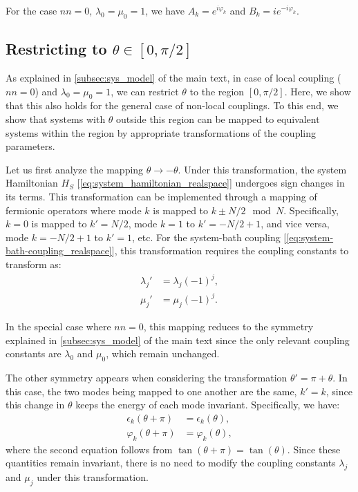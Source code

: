 For the case $nn=0$, $\lambda_0=\mu_0=1$, we have $A_k = e^{i\varphi_k}$ and $B_k = ie^{-i\varphi_k}$.

\subsection{Restricting to $\theta\in[0,\pi/2]$}
\label{app:theta_mapping}

As explained in \cref{subsec:sys_model} of the main text, in case of local coupling ($nn=0$) and $\lambda_0=\mu_0=1$, we can restrict $\theta$ to the region $[0,\pi/2]$. Here, we show that this also holds for the general case of non-local couplings. To this end, we show that systems with $\theta$ outside this region can be mapped to equivalent systems within the region by appropriate transformations of the coupling parameters.

Let us first analyze the mapping $\theta \rightarrow -\theta$. Under this transformation, the system Hamiltonian $H_S$ [\cref{eq:system_hamiltonian_realspace}] undergoes sign changes in its terms. This transformation can be implemented through a mapping of fermionic operators where mode $k$ is mapped to $k\pm N/2 \mod N$. Specifically, $k=0$ is mapped to $k'=N/2$, mode $k=1$ to $k'=-N/2+1$, and vice versa, mode $k=-N/2+1$ to $k'=1$, etc.
For the system-bath coupling [\cref{eq:system-bath-coupling_realspace}], this transformation requires the coupling constants to transform as:
\begin{align}
    \lambda_j' &= \lambda_j(-1)^j,\\
    \mu_j'     &= \mu_j(-1)^j.
\end{align}

In the special case where $nn=0$, this mapping reduces to the symmetry explained in \cref{subsec:sys_model} of the main text since the only relevant coupling constants are $\lambda_0$ and $\mu_0$, which remain unchanged.

The other symmetry appears when considering the transformation $\theta'=\pi+\theta$. In this case, the two modes being mapped to one another are the same, $k'=k$, since this change in $\theta$ keeps the energy of each mode invariant. Specifically, we have:
\begin{align}
    \epsilon_k(\theta+\pi) &= \epsilon_k(\theta),\\
    \varphi_k(\theta+\pi)  &= \varphi_k(\theta),
\end{align}
where the second equation follows from $\tan(\theta+\pi)=\tan(\theta)$.
Since these quantities remain invariant, there is no need to modify the coupling constants $\lambda_j$ and $\mu_j$ under this transformation.

